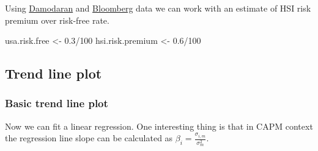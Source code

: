 \documentclass[]{article}
\newenvironment{Shaded}{\begin{snugshade}}{\end{snugshade}}
\newcommand{\KeywordTok}[1]{\textcolor[rgb]{0.13,0.29,0.53}{\textbf{{#1}}}}
\newcommand{\DataTypeTok}[1]{\textcolor[rgb]{0.13,0.29,0.53}{{#1}}}
\newcommand{\DecValTok}[1]{\textcolor[rgb]{0.00,0.00,0.81}{{#1}}}
\newcommand{\FloatTok}[1]{\textcolor[rgb]{0.00,0.00,0.81}{{#1}}}
\newcommand{\StringTok}[1]{\textcolor[rgb]{0.31,0.60,0.02}{{#1}}}
\newcommand{\NormalTok}[1]{{#1}}
\begin{document}
Using
\href{http://pages.stern.nyu.edu/~adamodar/New_Home_Page/datafile/ctryprem.html}{Damodaran}
and
\href{http://www.bloomberg.com/markets/rates-bonds/government-bonds/us}{Bloomberg}
data we can work with an estimate of HSI risk premium over risk-free
rate.

\begin{Shaded}
\begin{Highlighting}[]
\NormalTok{usa.risk.free <-}\StringTok{ }\FloatTok{0.3}\NormalTok{/}\DecValTok{100}
\NormalTok{hsi.risk.premium <-}\StringTok{ }\FloatTok{0.6}\NormalTok{/}\DecValTok{100}
\end{Highlighting}
\end{Shaded}

\subsection{Trend line plot}\label{trend-line-plot}

\subsubsection{Basic trend line plot}\label{basic-trend-line-plot}

Now we can fit a linear regression. One interesting thing is that in
CAPM context the regression line slope can be calculated as
\(\beta_i = \displaystyle \frac{\sigma_{i,m}}{\sigma_m^2}\).

\begin{Shaded}
\end{Shaded}
\end{document}
